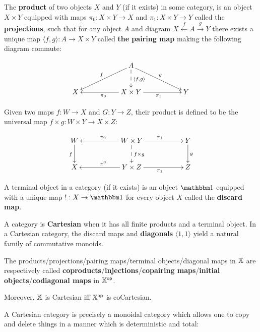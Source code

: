 \begin{definition}
The {\bf product} of two objects $X$ and $Y$ (if it exists) in some category, is an object $X\times Y$ equipped with maps $\pi_0:X\times Y\to X $ and $\pi_1:X\times Y \to Y$ called the {\bf projections},  such that for any object $A$ and diagram  $X \xleftarrow{f} A \xrightarrow{g} Y$ there exists a unique map $\langle  f, g \rangle :A \to X\times Y$ called {\bf the pairing map} making the following diagram commute:


$$
\xymatrix{
    &
    & A \ar[lld]_f \ar[rrd]^g \ar@{-->}[d]^{\langle f,g\rangle}
    &
    &
  \\X 
    &
    & X\times Y \ar[ll]^{\pi_0} \ar[rr]_{\pi_1}
    &
    & Y
}
$$ 

Given two maps $f:W\to X$ and $G:Y\to Z$, their product is defined to be the universal map $f\times g:W\times Y \to X\times Z$: 

$$
\xymatrix{
    W \ar[d]_f
    &
    & W\times Y \ar@{-->}[d]^{f\times g} \ar[ll]_{\pi_0} \ar[rr]^{\pi_1}
    &
    & Y \ar[d]^g
  \\X
    &
    & Y\times Z  \ar[ll]_{\pi^0} \ar[rr]_{\pi_1}
    &
    &Z
}
$$


A terminal object in a category (if it exists) is an object $\one$ equipped with a unique map $!:X\to \one$ for every object $X$ called the {\bf discard map}.



A category is  {\bf Cartesian} when it has all finite products and a terminal object. In a Cartesian category, the discard maps and {\bf diagonals} $\langle 1, 1 \rangle$ yield a natural family of commutative monoids.


The products/projections/pairing maps/terminal objects/diagonal maps in $\mathbb{X}$ are respectively called {\bf coproducts}/{\bf injections}/{\bf copairing maps}/{\bf initial objects}/{\bf codiagonal maps} in $\mathbb{X}^{\mathsf{op}}$.

Moreover, $\mathbb{X}$ is Cartesian iff $\mathbb{X}^{\mathsf{op}}$ is coCartesian.
\end{definition}





A Cartesian category is precisely a monoidal category which allows one to copy and delete things in a manner which is deterministic and total:

